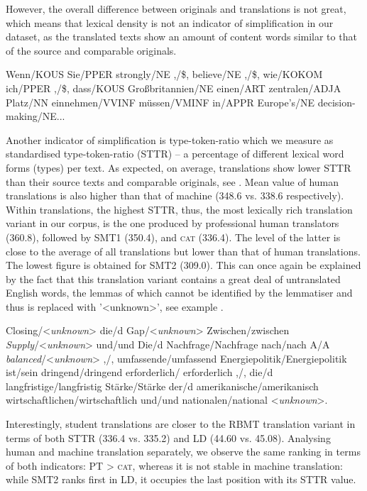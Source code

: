 \documentclass[output=paper]{LSP/langsci}
\begin{document}
However, the overall difference between originals and translations is not great, which means that lexical density is not an indicator of simplification in our dataset, as the translated texts show an amount of content words similar to that of the source and comparable originals.

\ea \label{ex:4:1}
Wenn/KOUS Sie/PPER strongly/NE ,/\$, believe/NE ,/\$, wie/KOKOM ich/PPER ,/\$, dass/KOUS Großbritannien/NE einen/ART zentralen/ADJA Platz/NN einnehmen/VVINF müssen/VMINF in/APPR Europe’s/NE decision-making/NE...
\z

Another indicator of simplification is type-token-ratio which we measure as standardised type-token-ratio (STTR) – a percentage of different lexical word forms (types) per text.  As expected, on average, translations show lower STTR than their source texts and comparable originals, see . Mean value of human translations is also higher than that of machine (348.6 vs. 338.6 respectively). Within translations, the highest STTR, thus, the most lexically rich translation variant in our corpus, is the one produced by professional human translators (360.8), followed by SMT1 (350.4), and \textsc{cat} (336.4).  The level of the latter is close to the average of all translations but lower than that of human translations. The lowest figure is obtained for SMT2 (309.0). This can once again be explained by the fact that this translation variant contains a great deal of untranslated English words, the lemmas of which cannot be identified by the lemmatiser and thus is replaced with '<unknown>’, see example .

\ea \label{ex:4:2}
Closing/<\textit{unknown}> die/d Gap/<\textit{unknown}> Zwischen/zwischen \textit{Supply}/<\textit{unknown}> und/und Die/d Nachfrage/Nachfrage nach/nach A/A \textit{balanced}/<\textit{unknown}> ,/, umfassende/umfassend Energiepolitik/Energiepolitik ist/sein dringend/dringend erforderlich/  erforderlich ,/, die/d langfristige/langfristig Stärke/Stärke der/d  amerikanische/amerikanisch wirtschaftlichen/wirtschaftlich und/und nationalen/national <\textit{unknown}>.
\z

Interestingly, student translations are closer to the RBMT translation variant in terms of both STTR (336.4 vs. 335.2) and LD (44.60 vs. 45.08). Analysing human and machine translation separately, we observe the same ranking in terms of both indicators: PT > \textsc{cat}, whereas it is not stable in machine translation: while SMT2 ranks first in LD, it occupies the last position with its STTR value.
\end{document}
